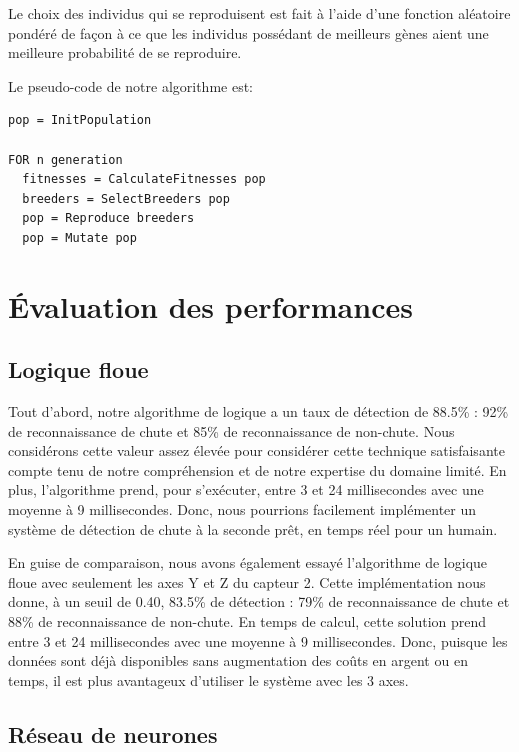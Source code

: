 \documentclass[12pt,letterpaper]{article}
\begin{document}
Le choix des individus qui se reproduisent est fait à l'aide d'une fonction aléatoire pondéré de façon à ce que les individus possédant
de meilleurs gènes aient une meilleure probabilité de se reproduire.

Le pseudo-code de notre algorithme est:

\begin{verbatim}
pop = InitPopulation

FOR n generation
  fitnesses = CalculateFitnesses pop
  breeders = SelectBreeders pop
  pop = Reproduce breeders
  pop = Mutate pop

\end{verbatim}


\section{Évaluation des performances}

\subsection{Logique floue}

Tout d'abord, notre algorithme de logique a un taux de détection de 88.5\% : 92\% de reconnaissance de chute et 85\% de reconnaissance de non-chute. Nous considérons cette valeur assez élevée pour considérer cette technique satisfaisante compte tenu de notre compréhension et de notre expertise du domaine limité. En plus, l'algorithme prend, pour s'exécuter, entre 3 et 24 millisecondes avec une moyenne à 9 millisecondes. Donc, nous pourrions facilement implémenter un système de détection de chute à la seconde prêt, en temps réel pour un humain.

En guise de comparaison, nous avons également essayé l'algorithme de logique floue avec seulement les axes Y et Z du capteur 2. Cette implémentation nous donne, à un seuil de 0.40, 83.5\% de détection : 79\% de reconnaissance de chute et 88\% de reconnaissance de non-chute. En temps de calcul, cette solution prend entre 3 et 24 millisecondes avec une moyenne à 9 millisecondes. Donc, puisque les données sont déjà disponibles sans augmentation des coûts en argent ou en temps, il est plus avantageux d'utiliser le système avec les 3 axes.

\subsection{Réseau de neurones} %
\end{document}
